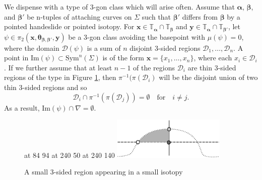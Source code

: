 \documentclass[11pt]{article}
\theoremstyle{plain} \newtheorem{thm}{Theorem}[subsection]
\theoremstyle{plain} \newtheorem{cor}[thm]{Corollary}
\theoremstyle{plain} \newtheorem{prop}[thm]{Proposition}
\theoremstyle{plain} \newtheorem{conj}[thm]{Conjecture}
\theoremstyle{plain} \newtheorem{lem}[thm]{Lemma}
\theoremstyle{definition} \newtheorem{df}[thm]{Definition}
\theoremstyle{remark} \newtheorem{rmk}[thm]{Remark}
\theoremstyle{remark} \newtheorem{obs}[thm]{Observation}
\newcommand{\ba}{\boldsymbol{\alpha}}
\newcommand{\bb}{\boldsymbol{\beta}}
\newcommand{\Ta}{\mathbb{T}_{\ba}}
\newcommand{\Tb}{\mathbb{T}_{\bb}}
\newcommand{\bx}{\mathbf{x}}
\newcommand{\by}{\mathbf{y}}
\newcommand{\thet}[1]{\boldsymbol{\theta}_{#1}}
\newcommand{\tor}[1]{\mathbb{T}_{#1}}
\numberwithin{equation}{section}
\begin{document}
We dispense with a type of 3-gon class which will arise often.  Assume that $\ba$, $\bb$, and $\bb'$ be n-tuples of attaching curves on $\Sigma$ such that $\bb'$ differs from $\bb$ by a pointed handeslide or pointed isotopy.  For $\bx \in \Ta \cap \Tb$ and $\by \in \Ta \cap \tor{\bb'}$, let $\psi \in \pi_{2}(\bx,\thet{\bb,\bb'},\by)$ be a 3-gon class avoiding the basepoint with $\mu(\psi) = 0$, where the domain $\mathcal{D}(\psi)$ is a sum of $n$ disjoint 3-sided regions $\mathcal{D}_1, \ldots, \mathcal{D}_n$.  A point in $\text{Im}(\psi) \subset \text{Sym}^n(\Sigma)$ is of the form $\bx = \{ x_1, \ldots, x_n\}$, where each $x_i \in \mathcal{D}_i$.  If we further assume that at least $n-1$ of the regions $\mathcal{D}_i$ are thin 3-sided regions of the type in Figure \ref{fig:smalltri}, then $\pi^{-1}(\pi(\mathcal{D}_{i})$ will be the disjoint union of two thin 3-sided regions and so
\begin{equation*}\label{eqn:adtri}
\mathcal{D}_i \cap \pi^{-1} \left( \pi \left( \mathcal{D}_j \right) \right) = \emptyset \quad \text{for} \quad i \neq j.
\end{equation*}
As a result, $\text{Im}(\psi) \cap \nabla = \emptyset$.

\begin{figure}[h!]
\centering
\begin{minipage}[c]{.38\linewidth}
\small
\pinlabel* {$\theta_{\bb \bb'}$} at 84 94
 at 240 50
 at 240 140
\endlabellist
\includegraphics[height = 20mm]{smalltri}
\end{minipage}
\begin{minipage}[c]{.60\linewidth}
\caption[A small triangle]{A small 3-sided region appearing in a small isotopy}
\label{fig:smalltri}
\end{minipage}
\end{figure}
\end{document}
